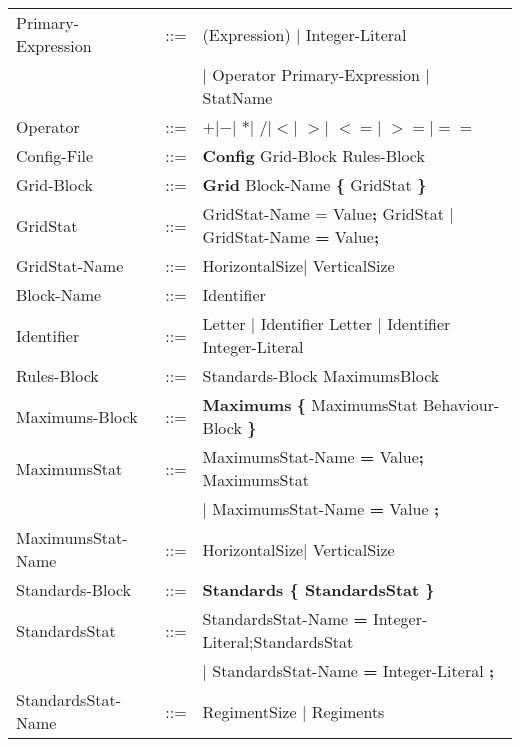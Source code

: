 \begin{tabular}{ l l l }
			Primary-Expression &	::=  & (Expression) $\mid$ Integer-Literal \\
							   &		 & $\mid$ Operator Primary-Expression $\mid$ StatName \\
			Operator 		   & 	::=	 & {\bf $+$}$\mid${\bf $-$}$\mid$ {\bf $*$}$\mid$ 
										   {\bf $/$}$\mid${\bf $<$}$\mid$ {\bf $>$}$\mid$ 
										   {\bf $<=$}$\mid$ {\bf $>=$}$\mid${\bf $==$}\\
			Config-File		   & 	::=  & {\bf Config} Grid-Block Rules-Block  		\\
			Grid-Block		   &	::=	 & {\bf Grid} Block-Name	 {\bf \{} GridStat \bf{\}} \\
			GridStat		   &	::=  & GridStat-Name = Value{\bf ;} GridStat $\mid$ GridStat-Name {\bf =} Value{\bf ;}   \\
			GridStat-Name	   &	::=  & HorizontalSize$\mid$ VerticalSize					\\
			Block-Name		   &	::=  & Identifier							\\
			Identifier		   &    ::=  & Letter $\mid$ Identifier Letter $\mid$ Identifier Integer-Literal \\
			Rules-Block		   &	::=	 & Standards-Block MaximumsBlock 				\\
			Maximums-Block	   &	::=	 & {\bf Maximums} {\bf \{} MaximumsStat Behaviour-Block {\bf \}}	\\
			MaximumsStat	   &	::=  & MaximumsStat-Name {\bf = } Value{\bf ;} MaximumsStat  			\\
							   &		 & $\mid$ MaximumsStat-Name {\bf = } Value {\bf ; }	 			 \\
			MaximumsStat-Name  &	::=  & HorizontalSize$\mid$ VerticalSize							\\
			Standards-Block	   &    ::=  & \bf{Standards} {\bf \{ } StandardsStat \bf{\} }					\\
			StandardsStat	   & 	::=	 & StandardsStat-Name {\bf = } Integer-Literal;StandardsStat 				\\
							   &		 & $\mid$ StandardsStat-Name {\bf = } Integer-Literal {\bf ; } 		\\
			StandardsStat-Name & 	::=	 & RegimentSize	$\mid$ Regiments									 \\
		\end{tabular}
		
